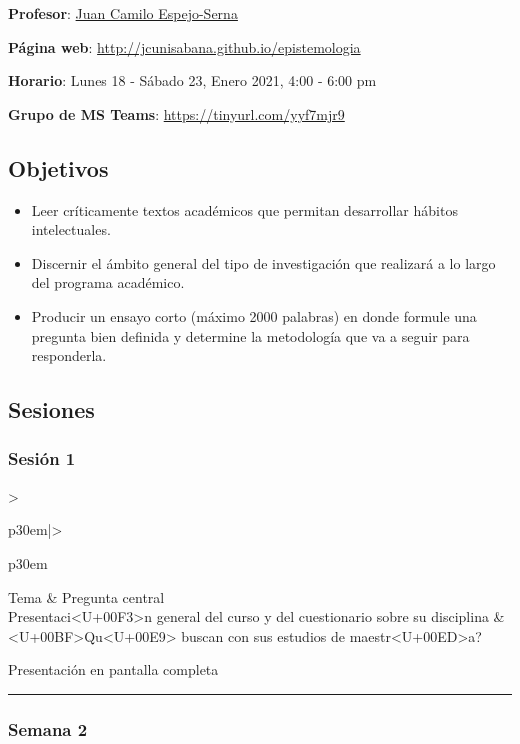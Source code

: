 \documentclass[spanish,]{article}
\begin{document}
\textbf{Profesor}: \href{../index.html}{Juan Camilo Espejo-Serna}~

\textbf{Página web}: \url{http://jcunisabana.github.io/epistemologia}

\textbf{Horario}: Lunes 18 - Sábado 23, Enero 2021, 4:00 - 6:00 pm

\textbf{Grupo de MS Teams}: \url{https://tinyurl.com/yyf7mjr9}

\subsection{Objetivos}\label{objetivos}

\begin{itemize}
\item
  Leer críticamente textos académicos que permitan desarrollar hábitos
  intelectuales.
\item
  Discernir el ámbito general del tipo de investigación que realizará a
  lo largo del programa académico.
\item
  Producir un ensayo corto (máximo 2000 palabras) en donde formule una
  pregunta bien definida y determine la metodología que va a seguir para
  responderla.
\end{itemize}

\subsection{Sesiones}\label{sesiones}

\subsubsection{Sesión 1}\label{sesiuxf3n-1}

\begin{tabular}{>{\raggedright\arraybackslash}p{30em}|>{\raggedright\arraybackslash}p{30em}}
\hline
Tema & Pregunta central\\
\hline
Presentaci<U+00F3>n general del curso y del cuestionario sobre su disciplina & <U+00BF>Qu<U+00E9> buscan con sus estudios de maestr<U+00ED>a?\\
\hline
\end{tabular}

Presentación en pantalla completa

\begin{center}\rule{0.5\linewidth}{\linethickness}\end{center}

\subsubsection{Semana 2}\label{semana-2}
\end{document}
